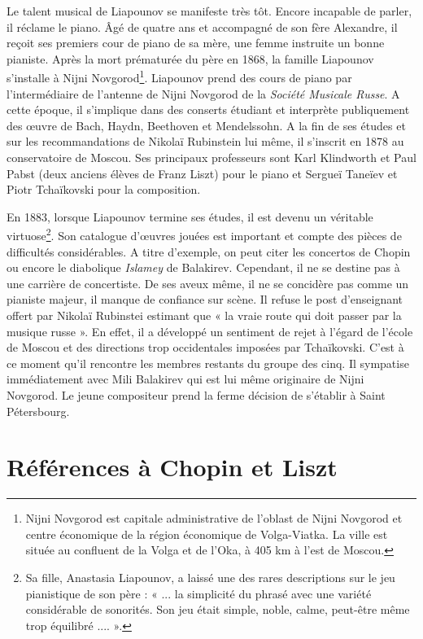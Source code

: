 Le talent musical de Liapounov se manifeste très tôt. Encore incapable de parler, il réclame le piano. Âgé de quatre ans et accompagné de son fère Alexandre, il reçoit ses premiers cour de piano de sa mère, une femme instruite un bonne pianiste. Après la mort prématurée du père en 1868, la famille Liapounov s'installe à Nijni Novgorod\footnote{Nijni Novgorod est capitale administrative de l'oblast de Nijni Novgorod et centre économique de la région économique de Volga-Viatka. La ville est située au confluent de la Volga et de l'Oka, à 405 km à l'est de Moscou.}. Liapounov prend des cours de piano par l'intermédiaire de l'antenne de Nijni Novgorod de la \emph{Société Musicale Russe}. A cette époque, il s'implique dans des conserts étudiant et interprète publiquement des œuvre de Bach, Haydn, Beethoven et Mendelssohn. A la fin de ses études et sur les recommandations de Nikolaï Rubinstein lui même, il s'inscrit en 1878 au conservatoire de Moscou. Ses principaux professeurs sont Karl Klindworth et Paul Pabst (deux anciens élèves de Franz Liszt) pour le piano et Sergueï Taneïev et Piotr Tchaïkovski pour la composition.

En 1883, lorsque Liapounov termine ses études, il est devenu un véritable virtuose\footnote{Sa fille, Anastasia Liapounov, a laissé une des rares descriptions sur le jeu pianistique de son père : « ... la simplicité du phrasé avec une variété considérable de sonorités. Son jeu était simple, noble, calme, peut-être même trop équilibré .... ».}. Son catalogue d'œuvres jouées est important et compte des pièces de difficultés considérables. A titre d'exemple, on peut citer les concertos de Chopin ou encore le diabolique \emph{Islamey} de Balakirev. Cependant, il ne se destine pas à une carrière de concertiste. De ses aveux même, il ne se concidère pas comme un pianiste majeur, il manque de confiance sur scène. Il refuse le post d'enseignant offert par Nikolaï Rubinstei estimant que « la vraie route qui doit passer par la musique russe ». En effet, il a développé un sentiment de rejet à l'égard de l'école de Moscou et des directions trop occidentales imposées par Tchaïkovski. C'est à ce moment qu'il rencontre les membres restants du groupe des cinq. Il sympatise immédiatement avec Mili Balakirev qui est lui même originaire de Nijni Novgorod. Le jeune compositeur prend la ferme décision de s'établir à Saint Pétersbourg.

\section{Références à Chopin et Liszt}

